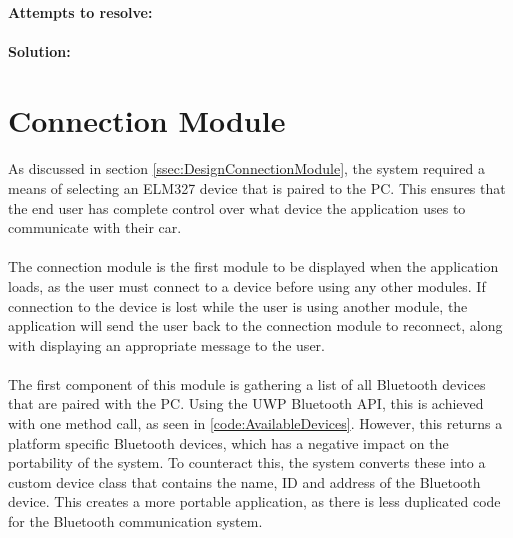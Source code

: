 {{{			\paragraph{Attempts to resolve:}
			
			\paragraph{Solution:}
		}
	}
	\label{ssec:DataModuleIssues}

\section{Connection Module}
		\paragraph{}{
		As discussed in section \ref{ssec:DesignConnectionModule}, the system required a means of selecting an ELM327 device that is paired to the PC. This ensures that the end user has complete control over what device the application uses to communicate with their car.
		}
		
		\paragraph{}{
		The connection module is the first module to be displayed when  the application loads, as the user must connect to a device before using any other modules. If connection to the device is lost while the user is using another module, the application will send the user back to the connection module to reconnect, along with displaying an appropriate message to the user.
		}
		
		\paragraph{}{
		The first component of this module is gathering a list of all Bluetooth devices that are paired	with the PC. Using the UWP Bluetooth API, this is achieved with one method call, as seen in \ref{code:AvailableDevices}. However, this returns a platform specific Bluetooth devices, which has a negative impact on the portability of the system. To counteract this, the system converts these into a custom device class that contains the name, ID and address of the Bluetooth device. This creates a more portable application, as there is less duplicated code for the Bluetooth communication system.
		}
		}
		
